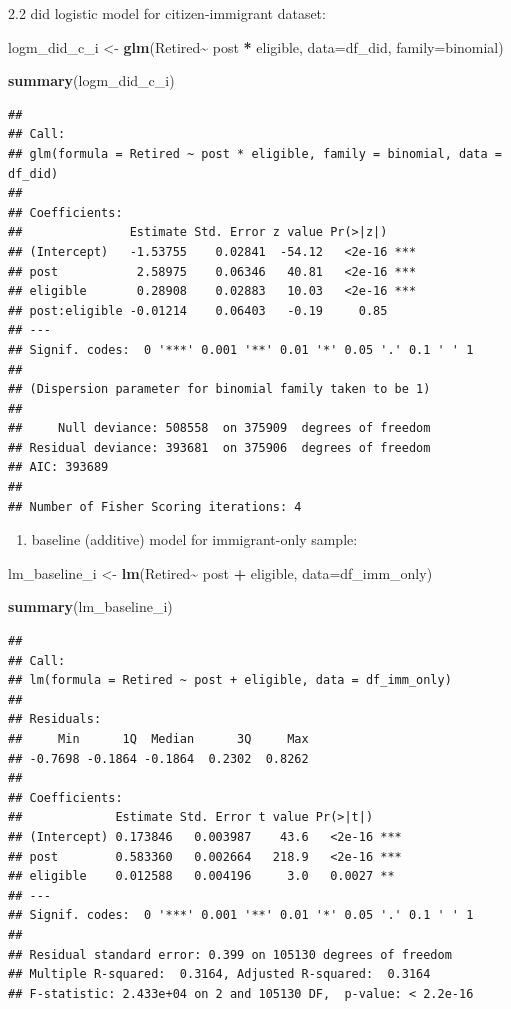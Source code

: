 \documentclass[
]{article}
\newenvironment{Shaded}{\begin{snugshade}}{\end{snugshade}}
\newcommand{\AttributeTok}[1]{\textcolor[rgb]{0.13,0.29,0.53}{#1}}
\newcommand{\FunctionTok}[1]{\textcolor[rgb]{0.13,0.29,0.53}{\textbf{#1}}}
\newcommand{\NormalTok}[1]{#1}
\newcommand{\OtherTok}[1]{\textcolor[rgb]{0.56,0.35,0.01}{#1}}
\newcommand{\SpecialCharTok}[1]{\textcolor[rgb]{0.81,0.36,0.00}{\textbf{#1}}}
\providecommand{\tightlist}{%
  \setlength{\itemsep}{0pt}\setlength{\parskip}{0pt}}
\begin{document}
2.2 did logistic model for citizen-immigrant dataset:

\begin{Shaded}
\begin{Highlighting}[]
\NormalTok{logm\_did\_c\_i }\OtherTok{\textless{}{-}} \FunctionTok{glm}\NormalTok{(Retired}\SpecialCharTok{\textasciitilde{}}\NormalTok{ post }\SpecialCharTok{*}\NormalTok{ eligible, }\AttributeTok{data=}\NormalTok{df\_did, }\AttributeTok{family=}\NormalTok{binomial)}

\FunctionTok{summary}\NormalTok{(logm\_did\_c\_i)}
\end{Highlighting}
\end{Shaded}

\begin{verbatim}
## 
## Call:
## glm(formula = Retired ~ post * eligible, family = binomial, data = df_did)
## 
## Coefficients:
##               Estimate Std. Error z value Pr(>|z|)    
## (Intercept)   -1.53755    0.02841  -54.12   <2e-16 ***
## post           2.58975    0.06346   40.81   <2e-16 ***
## eligible       0.28908    0.02883   10.03   <2e-16 ***
## post:eligible -0.01214    0.06403   -0.19     0.85    
## ---
## Signif. codes:  0 '***' 0.001 '**' 0.01 '*' 0.05 '.' 0.1 ' ' 1
## 
## (Dispersion parameter for binomial family taken to be 1)
## 
##     Null deviance: 508558  on 375909  degrees of freedom
## Residual deviance: 393681  on 375906  degrees of freedom
## AIC: 393689
## 
## Number of Fisher Scoring iterations: 4
\end{verbatim}

\begin{enumerate}
\def\labelenumi{\arabic{enumi}.}
\setcounter{enumi}{2}
\tightlist
\item
  baseline (additive) model for immigrant-only sample:
\end{enumerate}

\begin{Shaded}
\begin{Highlighting}[]
\NormalTok{lm\_baseline\_i }\OtherTok{\textless{}{-}} \FunctionTok{lm}\NormalTok{(Retired}\SpecialCharTok{\textasciitilde{}}\NormalTok{ post }\SpecialCharTok{+}\NormalTok{ eligible, }\AttributeTok{data=}\NormalTok{df\_imm\_only)}

\FunctionTok{summary}\NormalTok{(lm\_baseline\_i)}
\end{Highlighting}
\end{Shaded}

\begin{verbatim}
## 
## Call:
## lm(formula = Retired ~ post + eligible, data = df_imm_only)
## 
## Residuals:
##     Min      1Q  Median      3Q     Max 
## -0.7698 -0.1864 -0.1864  0.2302  0.8262 
## 
## Coefficients:
##             Estimate Std. Error t value Pr(>|t|)    
## (Intercept) 0.173846   0.003987    43.6   <2e-16 ***
## post        0.583360   0.002664   218.9   <2e-16 ***
## eligible    0.012588   0.004196     3.0   0.0027 ** 
## ---
## Signif. codes:  0 '***' 0.001 '**' 0.01 '*' 0.05 '.' 0.1 ' ' 1
## 
## Residual standard error: 0.399 on 105130 degrees of freedom
## Multiple R-squared:  0.3164, Adjusted R-squared:  0.3164 
## F-statistic: 2.433e+04 on 2 and 105130 DF,  p-value: < 2.2e-16
\end{verbatim}
\end{document}

